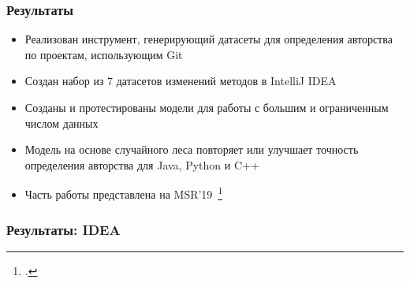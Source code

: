 \documentclass[xcolor=table]{beamer}
\begin{document}
\begin{frame}
	\frametitle{Результаты}
	\begin{itemize}
		\item Реализован инструмент, генерирующий датасеты для определения авторства по проектам, использующим Git
		\item Создан набор из 7 датасетов изменений методов в IntelliJ IDEA
		\item Созданы и протестированы модели для работы с большим и ограниченным числом данных
		\item Модель на основе случайного леса повторяет или улучшает точность определения авторства для Java, Python и C++
		\item Часть работы представлена на MSR'19~\footcite{msr2019}
	\end{itemize}
\end{frame}

\begin{frame}[allowframebreaks]
\printbibliography[heading=none]
\end{frame}

\begin{frame}
	\frametitle{Результаты: IDEA}
	\begin{table}[]
		\centering
		\end{table}
\end{frame}
\end{document}
